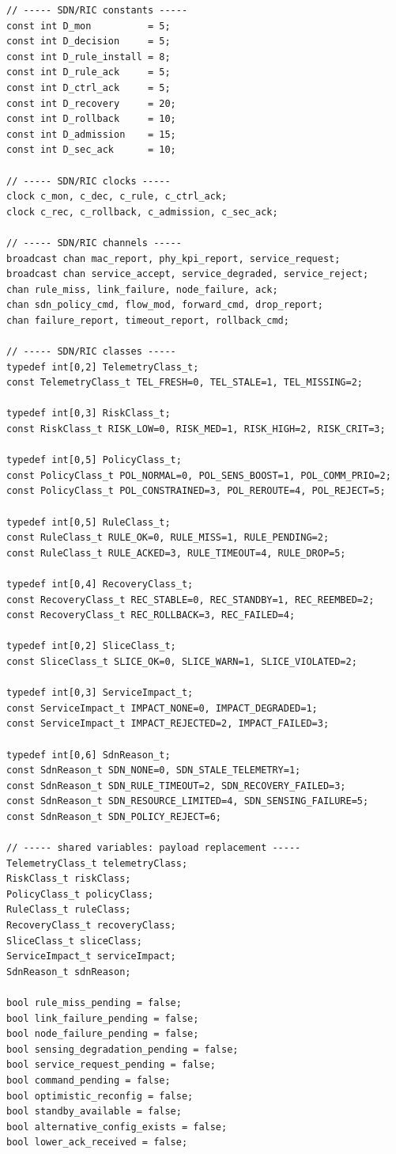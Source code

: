 \documentclass[10pt,a4paper]{article}
\begin{document}
\begin{verbatim}
// ----- SDN/RIC constants -----
const int D_mon          = 5;
const int D_decision     = 5;
const int D_rule_install = 8;
const int D_rule_ack     = 5;
const int D_ctrl_ack     = 5;
const int D_recovery     = 20;
const int D_rollback     = 10;
const int D_admission    = 15;
const int D_sec_ack      = 10;

// ----- SDN/RIC clocks -----
clock c_mon, c_dec, c_rule, c_ctrl_ack;
clock c_rec, c_rollback, c_admission, c_sec_ack;

// ----- SDN/RIC channels -----
broadcast chan mac_report, phy_kpi_report, service_request;
broadcast chan service_accept, service_degraded, service_reject;
chan rule_miss, link_failure, node_failure, ack;
chan sdn_policy_cmd, flow_mod, forward_cmd, drop_report;
chan failure_report, timeout_report, rollback_cmd;

// ----- SDN/RIC classes -----
typedef int[0,2] TelemetryClass_t;
const TelemetryClass_t TEL_FRESH=0, TEL_STALE=1, TEL_MISSING=2;

typedef int[0,3] RiskClass_t;
const RiskClass_t RISK_LOW=0, RISK_MED=1, RISK_HIGH=2, RISK_CRIT=3;

typedef int[0,5] PolicyClass_t;
const PolicyClass_t POL_NORMAL=0, POL_SENS_BOOST=1, POL_COMM_PRIO=2;
const PolicyClass_t POL_CONSTRAINED=3, POL_REROUTE=4, POL_REJECT=5;

typedef int[0,5] RuleClass_t;
const RuleClass_t RULE_OK=0, RULE_MISS=1, RULE_PENDING=2;
const RuleClass_t RULE_ACKED=3, RULE_TIMEOUT=4, RULE_DROP=5;

typedef int[0,4] RecoveryClass_t;
const RecoveryClass_t REC_STABLE=0, REC_STANDBY=1, REC_REEMBED=2;
const RecoveryClass_t REC_ROLLBACK=3, REC_FAILED=4;

typedef int[0,2] SliceClass_t;
const SliceClass_t SLICE_OK=0, SLICE_WARN=1, SLICE_VIOLATED=2;

typedef int[0,3] ServiceImpact_t;
const ServiceImpact_t IMPACT_NONE=0, IMPACT_DEGRADED=1;
const ServiceImpact_t IMPACT_REJECTED=2, IMPACT_FAILED=3;

typedef int[0,6] SdnReason_t;
const SdnReason_t SDN_NONE=0, SDN_STALE_TELEMETRY=1;
const SdnReason_t SDN_RULE_TIMEOUT=2, SDN_RECOVERY_FAILED=3;
const SdnReason_t SDN_RESOURCE_LIMITED=4, SDN_SENSING_FAILURE=5;
const SdnReason_t SDN_POLICY_REJECT=6;

// ----- shared variables: payload replacement -----
TelemetryClass_t telemetryClass;
RiskClass_t riskClass;
PolicyClass_t policyClass;
RuleClass_t ruleClass;
RecoveryClass_t recoveryClass;
SliceClass_t sliceClass;
ServiceImpact_t serviceImpact;
SdnReason_t sdnReason;

bool rule_miss_pending = false;
bool link_failure_pending = false;
bool node_failure_pending = false;
bool sensing_degradation_pending = false;
bool service_request_pending = false;
bool command_pending = false;
bool optimistic_reconfig = false;
bool standby_available = false;
bool alternative_config_exists = false;
bool lower_ack_received = false;
\end{verbatim}
\end{document}
